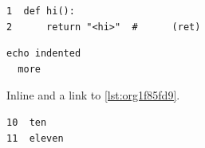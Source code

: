 \begin{verbatim}
1  def hi():
2      return "<hi>"  #      (ret)
\end{verbatim}

\begin{verbatim}
echo indented
  more
\end{verbatim}

Inline and a link to \ref{lst:org1f85fd9}.

\begin{verbatim}
10  ten
11  eleven
\end{verbatim}
